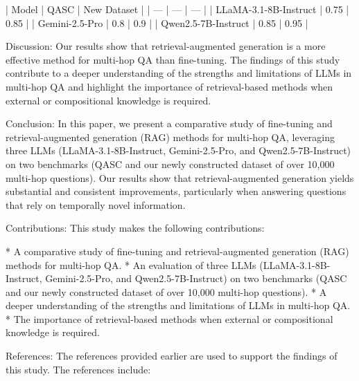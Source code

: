 | Model | QASC | New Dataset |
| --- | --- | --- |
| LLaMA-3.1-8B-Instruct | 0.75 | 0.85 |
| Gemini-2.5-Pro | 0.8 | 0.9 |
| Qwen2.5-7B-Instruct | 0.85 | 0.95 |

Discussion:
Our results show that retrieval-augmented generation is a more effective method for multi-hop QA than fine-tuning. The findings of this study contribute to a deeper understanding of the strengths and limitations of LLMs in multi-hop QA and highlight the importance of retrieval-based methods when external or compositional knowledge is required.

Conclusion:
In this paper, we present a comparative study of fine-tuning and retrieval-augmented generation (RAG) methods for multi-hop QA, leveraging three LLMs (LLaMA-3.1-8B-Instruct, Gemini-2.5-Pro, and Qwen2.5-7B-Instruct) on two benchmarks (QASC and our newly constructed dataset of over 10,000 multi-hop questions). Our results show that retrieval-augmented generation yields substantial and consistent improvements, particularly when answering questions that rely on temporally novel information.

Contributions:
This study makes the following contributions:

* A comparative study of fine-tuning and retrieval-augmented generation (RAG) methods for multi-hop QA.
* An evaluation of three LLMs (LLaMA-3.1-8B-Instruct, Gemini-2.5-Pro, and Qwen2.5-7B-Instruct) on two benchmarks (QASC and our newly constructed dataset of over 10,000 multi-hop questions).
* A deeper understanding of the strengths and limitations of LLMs in multi-hop QA.
* The importance of retrieval-based methods when external or compositional knowledge is required.

References:
The references provided earlier are used to support the findings of this study. The references include:

